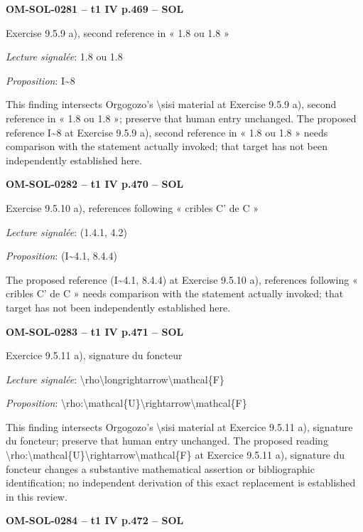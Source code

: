 \par\noindent\textbf{OM-SOL-0281 -- t1 IV p.469 -- SOL}\par
Exercise 9.5.9 a), second reference in « 1.8 ou 1.8 »\par
\emph{Lecture signalée}: 1.8 ou 1.8\par
\emph{Proposition}: I\textasciitilde{}8\par
This finding intersects Orgogozo's \textbackslash{}sisi material at Exercise 9.5.9 a), second reference in « 1.8 ou 1.8 »; preserve that human entry unchanged. The proposed reference I\textasciitilde{}8 at Exercise 9.5.9 a), second reference in « 1.8 ou 1.8 » needs comparison with the statement actually invoked; that target has not been independently established here.\par
\par\noindent\textbf{OM-SOL-0282 -- t1 IV p.470 -- SOL}\par
Exercise 9.5.10 a), references following « cribles C' de C »\par
\emph{Lecture signalée}: (1.4.1, 4.2)\par
\emph{Proposition}: (I\textasciitilde{}4.1, 8.4.4)\par
The proposed reference (I\textasciitilde{}4.1, 8.4.4) at Exercise 9.5.10 a), references following « cribles C' de C » needs comparison with the statement actually invoked; that target has not been independently established here.\par
\par\noindent\textbf{OM-SOL-0283 -- t1 IV p.471 -- SOL}\par
Exercice 9.5.11 a), signature du foncteur\par
\emph{Lecture signalée}: \textbackslash{}rho\textbackslash{}longrightarrow\textbackslash{}mathcal\{F\}\par
\emph{Proposition}: \textbackslash{}rho:\textbackslash{}mathcal\{U\}\textbackslash{}rightarrow\textbackslash{}mathcal\{F\}\par
This finding intersects Orgogozo's \textbackslash{}sisi material at Exercice 9.5.11 a), signature du foncteur; preserve that human entry unchanged. The proposed reading \textbackslash{}rho:\textbackslash{}mathcal\{U\}\textbackslash{}rightarrow\textbackslash{}mathcal\{F\} at Exercice 9.5.11 a), signature du foncteur changes a substantive mathematical assertion or bibliographic identification; no independent derivation of this exact replacement is established in this review.\par
\par\noindent\textbf{OM-SOL-0284 -- t1 IV p.472 -- SOL}\par
